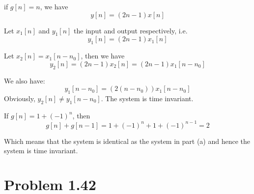\documentclass[koma,a4paper,utopia,12pt,listings-color,microtype,paralist,colorlinks,urlcolor=red]{org-article}
\begin{document}
if \(g[n] = n\), we have
\begin{equation*}
y[n] = (2n-1) x[n]
\end{equation*}

Let \(x_{1}[n]\) and \(y_{1}[n]\) the input and output respectively, i.e.
\begin{equation*}
y_{1}[n] = (2n-1)x_{1}[n]
\end{equation*}

Let \(x_{2}[n] = x_{1}[n-n_{0}]\), then we have
\begin{equation*}
y_{2}[n] = (2n-1)x_{2}[n] = (2n-1)x_{1}[n-n_{0}]
\end{equation*}

We also have:
\begin{equation*}
y_{1}[n-n_{0}] = ( 2(n-n_{0}) ) x_{1}[n-n_{0}]
\end{equation*}
Obviously, \(y_{2}[n]\neq y_{1}[n-n_{0}]\). The system is time invariant.

If \(g[n] = 1 + (-1)^{n}\), then
\begin{equation*}
g[n] + g[n-1] = 1 + (-1)^{n} + 1 + (-1)^{n-1} = 2
\end{equation*}

Which means that the system is identical as the system in part (a) and hence the
system is time invariant.
\section{Problem 1.42}
\label{sec:orgb6902d3}
\end{document}
